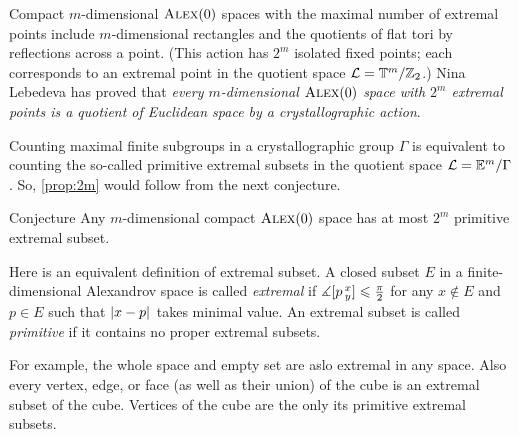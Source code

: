 Compact $m$-dimensional $\textsc{Alex}(0)$ spaces with the maximal number of extremal points include $m$-dimensional rectangles and the quotients of flat tori by reflections across a point.
(This action has $2^m$ isolated fixed points; each corresponds to an extremal point in the quotient space $\mathcal{L}=\mathbb{T}^m/\mathbb{Z}_2$.)
Nina Lebedeva has proved \cite{lebedeva} that \textit{every $m$-dimensional $\textsc{Alex}(0)$ space with $2^m$ extremal points is a quotient of Euclidean space by a crystallographic action}.

Counting maximal finite subgroups in a crystallographic group $\Gamma$ is equivalent to counting the so-called primitive extremal subsets in the quotient space $\mathcal{L}=\mathbb{E}^m/\Gamma$.
So, \ref{prop:2m} would follow from the next conjecture.

\begin{thm}{Conjecture}
Any $m$-dimensional compact $\textsc{Alex}(0)$ space has at most $2^m$ primitive extremal subset.
\end{thm}

Here is an equivalent definition of extremal subset.  
A closed subset $E$ in a finite-dimensional Alexandrov space is called 
\emph{extremal} if $\measuredangle[p\,{}^{x}_{y}]\leqslant \tfrac\pi2$ for any $x\notin E$ and $p\in E$ such that $|{x}-{p}|_{}^{{}}$ takes minimal value.
An extremal subset is called \emph{primitive} if it contains no proper extremal subsets.

For example, the whole space and empty set are aslo extremal in any space.
Also every vertex, edge, or face (as well as their union) of the cube is an extremal subset of the cube.
Vertices of the cube are the only its primitive extremal subsets.

